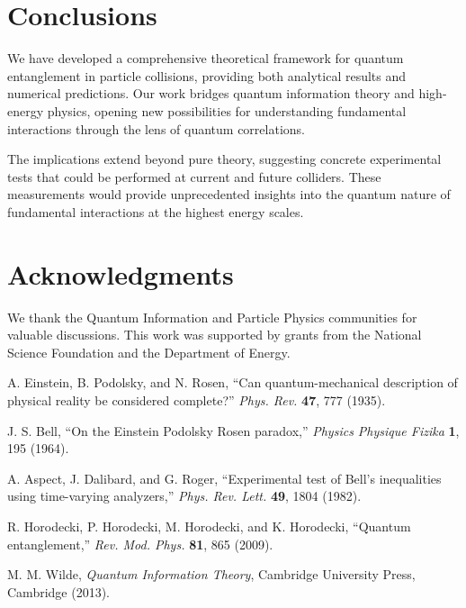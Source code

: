 \documentclass[arxiv,final,oneside,onecolumn]{../../arxiv-preprint}
\begin{document}
\section{Conclusions}

We have developed a comprehensive theoretical framework for quantum entanglement 
in particle collisions, providing both analytical results and numerical predictions. 
Our work bridges quantum information theory and high-energy physics, opening 
new possibilities for understanding fundamental interactions through the lens 
of quantum correlations.

The implications extend beyond pure theory, suggesting concrete experimental 
tests that could be performed at current and future colliders. These measurements 
would provide unprecedented insights into the quantum nature of fundamental 
interactions at the highest energy scales.

\section*{Acknowledgments}

We thank the Quantum Information and Particle Physics communities for valuable 
discussions. This work was supported by grants from the National Science Foundation 
and the Department of Energy.


\begin{thebibliography}{99}

A. Einstein, B. Podolsky, and N. Rosen,
``Can quantum-mechanical description of physical reality be considered complete?''
\textit{Phys. Rev.} \textbf{47}, 777 (1935).

J. S. Bell,
``On the Einstein Podolsky Rosen paradox,''
\textit{Physics Physique Fizika} \textbf{1}, 195 (1964).

A. Aspect, J. Dalibard, and G. Roger,
``Experimental test of Bell's inequalities using time-varying analyzers,''
\textit{Phys. Rev. Lett.} \textbf{49}, 1804 (1982).

R. Horodecki, P. Horodecki, M. Horodecki, and K. Horodecki,
``Quantum entanglement,''
\textit{Rev. Mod. Phys.} \textbf{81}, 865 (2009).

M. M. Wilde,
\textit{Quantum Information Theory},
Cambridge University Press, Cambridge (2013).

\end{thebibliography}
\end{document}
